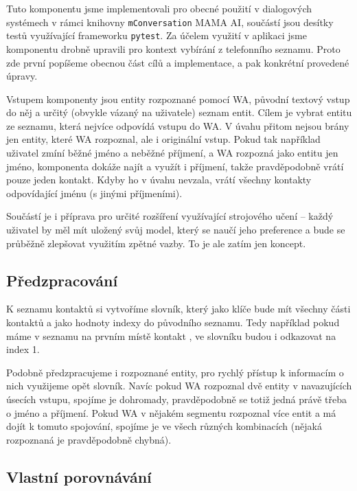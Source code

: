 Tuto komponentu jsme implementovali pro obecné použití v dialogových systémech
v rámci knihovny \texttt{mConversation} MAMA AI, součástí jsou desítky testů
využívající frameworku \texttt{pytest}. Za účelem využití v aplikaci jsme komponentu
drobně upravili pro kontext vybírání z telefonního seznamu. Proto zde první popíšeme
obecnou část cílů a implementace, a pak konkrétní provedené úpravy.

Vstupem komponenty jsou entity rozpoznané pomocí WA, původní textový vstup do něj
a určitý (obvykle vázaný na uživatele) seznam entit. Cílem je vybrat entitu ze seznamu,
která nejvíce odpovídá vstupu do WA. V úvahu přitom nejsou brány jen entity, které
WA rozpoznal, ale i originální vstup. Pokud tak například uživatel zmíní běžné jméno a
neběžné příjmení, a WA rozpozná jako entitu jen jméno, komponenta dokáže najít a využít
i příjmení, takže pravděpodobně vrátí pouze jeden kontakt. Kdyby ho v úvahu nevzala,
vrátí všechny kontakty odpovídající jménu (s jinými příjmeními).

Součástí je i příprava pro určité rozšíření využívající strojového učení -- každý
uživatel by měl mít uložený svůj model, který se naučí jeho preference a bude se
průběžně zlepšovat využitím zpětné vazby. To je ale zatím jen koncept.

\subsection{Předzpracování}

K seznamu kontaktů si vytvoříme slovník,
který jako klíče bude mít všechny části kontaktů a jako hodnoty indexy do původního
seznamu. Tedy například pokud máme v seznamu na prvním místě kontakt ,
ve slovníku budou  i  odkazovat na index 1.

Podobně předzpracujeme i rozpoznané entity, pro rychlý přístup k informacím o nich
využijeme opět slovník. Navíc pokud WA rozpoznal dvě entity v navazujících úsecích vstupu,
spojíme je dohromady, pravděpodobně se totiž jedná právě třeba o jméno a příjmení.
Pokud WA v nějakém segmentu rozpoznal více entit a má dojít k tomuto spojování, spojíme
je ve všech různých kombinacích (nějaká rozpoznaná je pravděpodobně chybná).

\subsection{Vlastní porovnávání}

